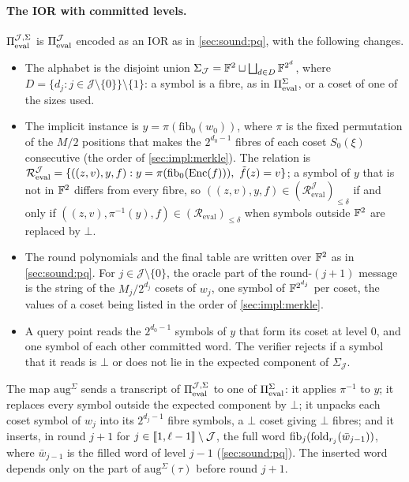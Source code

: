 \paragraph{The IOR with committed levels.}
$\Pi_{\mathrm{eval}}^{\mathcal{J},\Sigma}$ is $\Pi_{\mathrm{eval}}^{\mathcal{J}}$ encoded as an IOR as in \cref{sec:sound:pq}, with the following changes.
\begin{itemize}
  \item The alphabet is the disjoint union $\Sigma_{\mathcal{J}} = \mathbb{F}^2 \sqcup \bigsqcup_{d \in D} \mathbb{F}^{2^d}$, where $D = \{d_j : j \in \mathcal{J} \setminus \{0\}\} \setminus \{1\}$: a symbol is a fibre, as in $\Pi_{\mathrm{eval}}^{\Sigma}$, or a coset of one of the sizes used.
  \item The implicit instance is $y = \pi(\mathrm{fib}_0(w_0))$, where $\pi$ is the fixed permutation of the $M/2$ positions that makes the $2^{d_0 - 1}$ fibres of each coset $S_0(\xi)$ consecutive (the order of \cref{sec:impl:merkle}). The relation is $\mathcal{R}^{\mathcal{J}}_{\mathrm{eval}} = \{((z,v), y, f) : y = \pi(\mathrm{fib}_0(\mathrm{Enc}(f))),\ \tilde f(z) = v\}$; a symbol of $y$ that is not in $\mathbb{F}^2$ differs from every fibre, so $((z,v), y, f) \in (\mathcal{R}^{\mathcal{J}}_{\mathrm{eval}})_{\le\delta}$ if and only if $((z,v), \pi^{-1}(y), f) \in (\mathcal{R}_{\mathrm{eval}})_{\le\delta}$ when symbols outside $\mathbb{F}^2$ are replaced by $\bot$.
  \item The round polynomials and the final table are written over $\mathbb{F}^2$ as in \cref{sec:sound:pq}. For $j \in \mathcal{J} \setminus \{0\}$, the oracle part of the round-$(j+1)$ message is the string of the $M_j/2^{d_j}$ cosets of $w_j$, one symbol of $\mathbb{F}^{2^{d_j}}$ per coset, the values of a coset being listed in the order of \cref{sec:impl:merkle}.
  \item A query point reads the $2^{d_0 - 1}$ symbols of $y$ that form its coset at level $0$, and one symbol of each other committed word. The verifier rejects if a symbol that it reads is $\bot$ or does not lie in the expected component of $\Sigma_{\mathcal{J}}$.
\end{itemize}
The map $\mathrm{aug}^{\Sigma}$ sends a transcript of $\Pi_{\mathrm{eval}}^{\mathcal{J},\Sigma}$ to one of $\Pi_{\mathrm{eval}}^{\Sigma}$: it applies $\pi^{-1}$ to $y$; it replaces every symbol outside the expected component by $\bot$; it unpacks each coset symbol of $w_j$ into its $2^{d_j - 1}$ fibre symbols, a $\bot$ coset giving $\bot$ fibres; and it inserts, in round $j+1$ for $j \in \llbracket 1, \ell-1 \rrbracket \setminus \mathcal{J}$, the full word $\mathrm{fib}_j(\mathrm{fold}_{r_j}(\bar w_{j-1}))$, where $\bar w_{j-1}$ is the filled word of level $j-1$ (\cref{sec:sound:pq}). The inserted word depends only on the part of $\mathrm{aug}^{\Sigma}(\tau)$ before round $j+1$.

